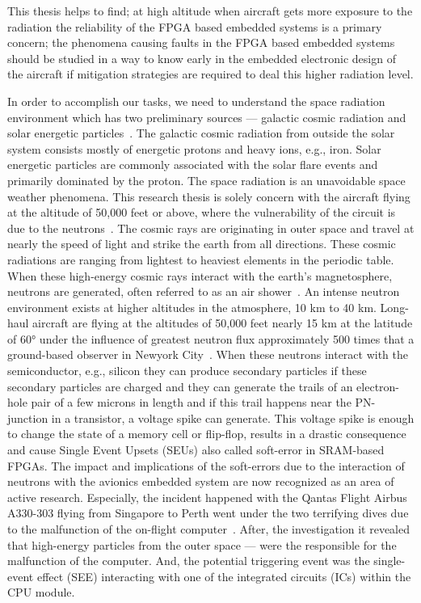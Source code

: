 This thesis helps to find; at high altitude when aircraft gets more exposure to the radiation the reliability of the FPGA based embedded systems is a primary concern; the phenomena causing faults in the FPGA based embedded systems should be studied in a way to know early in the embedded electronic design of the aircraft if mitigation strategies are required to deal this higher radiation level. 

In order to accomplish our tasks, we need to understand the space radiation environment which has two preliminary sources --- galactic cosmic radiation and solar energetic particles~\cite{SWE20216}. The galactic cosmic radiation from outside the solar system consists mostly of energetic protons and heavy ions, e.g., iron. Solar energetic particles are commonly associated with the solar flare events and primarily dominated by the proton.  The space radiation is an unavoidable space weather phenomena. This research thesis is solely concern with the aircraft flying at the altitude of 50,000 feet or above, where the vulnerability of the circuit is due to the neutrons~\cite{xilinnseu}. The cosmic rays are originating in outer space and travel at nearly the speed of light and strike the earth from all directions. These cosmic radiations are ranging from lightest to heaviest elements in the periodic table. When these high-energy cosmic rays interact with the earth's magnetosphere, neutrons are generated, often referred to as an air shower~\cite{lesea2005rosetta}.  An intense neutron environment exists at higher altitudes in the atmosphere, 10 km to 40 km.  Long-haul aircraft are flying at the altitudes of 50,000 feet nearly 15 km at the latitude of \ang{60} under the influence of greatest neutron flux approximately 500 times that a ground-based observer in Newyork City~\cite{lesea2005rosetta}. When these neutrons interact with the semiconductor, e.g., silicon they can produce secondary particles if these secondary particles are charged and they can generate the trails of an electron-hole pair of a few microns in length and if this trail happens near the PN-junction in a transistor, a voltage spike can generate. This voltage spike is enough to change the state of a memory cell or flip-flop, results in a drastic consequence and cause Single Event Upsets (SEUs) also called soft-error in SRAM-based FPGAs. The impact and implications of the soft-errors due to the interaction of neutrons with the avionics embedded system are now recognized as an area of active research. Especially, the incident happened with the Qantas Flight Airbus A330-303 flying from Singapore to Perth went under the two terrifying dives due to the malfunction of the on-flight computer~\citep{SWE20216}. After, the investigation it revealed that high-energy particles from the outer space --- were the responsible for the malfunction of the computer. And, the potential triggering event was the single-event effect (SEE) interacting with one of the integrated circuits (ICs) within the CPU module. 




